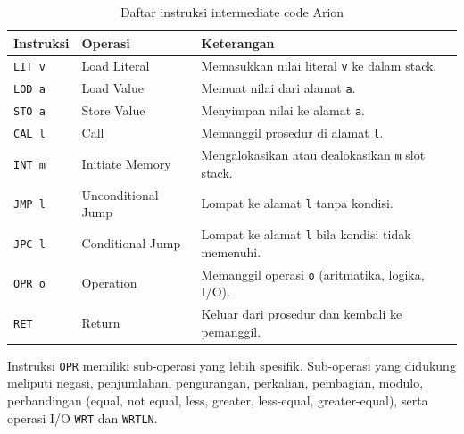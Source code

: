 \begin{table}[H]
    \centering
    \caption{Daftar instruksi intermediate code Arion}
    \label{tab:instruction-set}
    \begin{tabularx}{\textwidth}{L L C{2.8cm}}
        \toprule
        \textbf{Instruksi} & \textbf{Operasi} & \textbf{Keterangan} \\
        \midrule
        \texttt{LIT v} & Load Literal & Memasukkan nilai literal \texttt{v} ke dalam stack. \\
        \texttt{LOD a} & Load Value & Memuat nilai dari alamat \texttt{a}. \\
        \texttt{STO a} & Store Value & Menyimpan nilai ke alamat \texttt{a}. \\
        \texttt{CAL l} & Call & Memanggil prosedur di alamat \texttt{l}. \\
        \texttt{INT m} & Initiate Memory & Mengalokasikan atau dealokasikan \texttt{m} slot stack. \\
        \texttt{JMP l} & Unconditional Jump & Lompat ke alamat \texttt{l} tanpa kondisi. \\
        \texttt{JPC l} & Conditional Jump & Lompat ke alamat \texttt{l} bila kondisi tidak memenuhi. \\
        \texttt{OPR o} & Operation & Memanggil operasi \texttt{o} (aritmatika, logika, I/O). \\
        \texttt{RET} & Return & Keluar dari prosedur dan kembali ke pemanggil. \\
        \bottomrule
    \end{tabularx}
\end{table}

Instruksi \texttt{OPR} memiliki sub-operasi yang lebih spesifik. Sub-operasi yang didukung meliputi negasi, penjumlahan, pengurangan, perkalian, pembagian, modulo, perbandingan (equal, not equal, less, greater, less-equal, greater-equal), serta operasi I/O \texttt{WRT} dan \texttt{WRTLN}.

